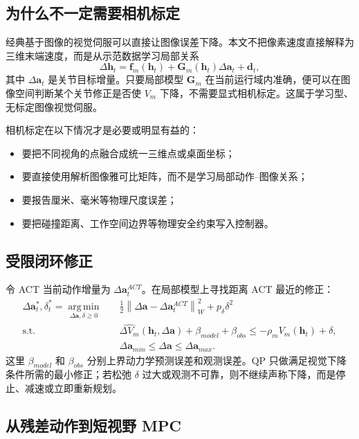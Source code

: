 \documentclass[UTF8,a4paper,11pt]{ctexart}
\newcommand{\norm}[1]{\left\lVert #1 \right\rVert}
\newcommand{\argmin}{\operatorname*{arg\,min}}
\begin{document}
\subsection{为什么不一定需要相机标定}

经典基于图像的视觉伺服可以直接让图像误差下降\cite{chaumette2006visual}。本文不把像素速度直接解释为三维末端速度，而是从示范数据学习局部关系
\begin{equation}
\Delta\bm h_t=\bm f_m(\bm h_t)+
\bm G_m(\bm h_t)\Delta\bm a_t+\bm d_t,
\end{equation}
其中 $\Delta\bm a_t$ 是关节目标增量。只要局部模型 $\bm G_m$ 在当前运行域内准确，便可以在图像空间判断某个关节修正是否使 $V_m$ 下降，不需要显式相机标定。这属于学习型、无标定图像视觉伺服。

相机标定在以下情况才是必要或明显有益的：
\begin{itemize}[leftmargin=2.3em]
  \item 要把不同视角的点融合成统一三维点或桌面坐标；
  \item 要直接使用解析图像雅可比矩阵，而不是学习局部动作--图像关系；
  \item 要报告厘米、毫米等物理尺度误差；
  \item 要把碰撞距离、工作空间边界等物理安全约束写入控制器。
\end{itemize}

\subsection{受限闭环修正}

令 ACT 当前动作增量为 $\Delta\bm a_t^{ACT}$。在局部模型上寻找距离 ACT 最近的修正：
\begin{align}
\Delta\bm a_t^*,\delta_t^*=\argmin_{\Delta\bm a,\delta\geq0}\quad
&\frac{1}{2}\norm{\Delta\bm a-\Delta\bm a_t^{ACT}}_{W}^{2}
+p_\delta\delta^2\\
\text{s.t.}\quad
&\widehat{\Delta V_m}(\bm h_t,\Delta\bm a)
+\beta_{model}+\beta_{obs}
\leq-\rho_m V_m(\bm h_t)+\delta,\\
&\Delta\bm a_{min}\leq\Delta\bm a\leq\Delta\bm a_{max}.
\end{align}
这里 $\beta_{model}$ 和 $\beta_{obs}$ 分别上界动力学预测误差和观测误差。QP 只做满足视觉下降条件所需的最小修正；若松弛 $\delta$ 过大或观测不可靠，则不继续声称下降，而是停止、减速或立即重新规划。

\subsection{从残差动作到短视野 MPC}
\end{document}
